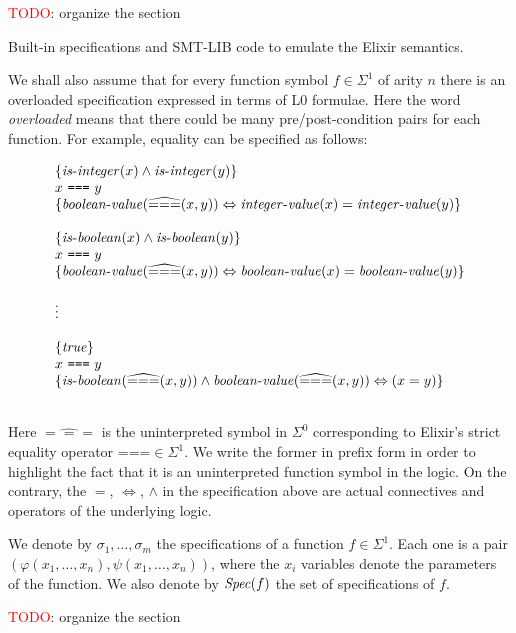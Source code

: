 \textcolor{red}{TODO}: organize the section

Built-in specifications and SMT-LIB code to emulate the 
Elixir semantics.

We shall also assume that for every function symbol $f \in \Sigma^{1}$ of 
arity $n$ there is an overloaded specification expressed in terms of L0 
formulae. Here the word \emph{overloaded} means that there could be many 
pre/post-condition pairs for each function. For example, equality can be 
specified as follows:

\[
\begin{array}{l}
\{ \mathit{is\mbox{-}integer}(x) \wedge \mathit{is\mbox{-}integer}(y) \}\\
x~\texttt{===}~y\\
\{ \mathit{boolean\mbox{-}value}(\widehat{===}(x, y)) \Leftrightarrow \mathit{integer\mbox{-}value}(x) = \mathit{integer\mbox{-}value}(y) \}\\
\\
\{ \mathit{is\mbox{-}boolean}(x) \wedge \mathit{is\mbox{-}boolean}(y) \}\\
x~\texttt{===}~y\\
\{ \mathit{boolean\mbox{-}value}(\widehat{===}(x, y)) \Leftrightarrow \mathit{boolean\mbox{-}value}(x) = \mathit{boolean\mbox{-}value}(y) \}\\
\\
\vdots
\\
\\
\{\mathit{true}\}\\
x~\texttt{===}~y\\
\{ \mathit{is\mbox{-}boolean}(\widehat{===}(x, y)) \wedge \mathit{boolean\mbox{-}value}(\widehat{===}(x, y)) \Leftrightarrow (x = y) \}\\
\\
\end{array}
\]

Here $\widehat{===}$ is the uninterpreted symbol in $\Sigma^{0}$ corresponding 
to Elixir's strict equality operator $\texttt{===} \in \Sigma^{1}$. We write 
the former in prefix form in order to highlight the fact that it is an 
uninterpreted function symbol in the logic. On the contrary, the $=$, 
$\Leftrightarrow$, $\wedge$ in the specification above are actual connectives 
and operators of the underlying logic.

We denote by $\sigma_1, \ldots, \sigma_m$ the specifications of a 
function $f \in \Sigma^{1}$. Each one is a pair 
$(\varphi(x_1, \ldots, x_n), \psi(x_1, \ldots, x_n))$, where the $x_i$ 
variables denote the parameters of the function. We also denote by $\mathit{Spec}(f)$ 
the set of specifications of $f$.

\textcolor{red}{TODO}: organize the section

